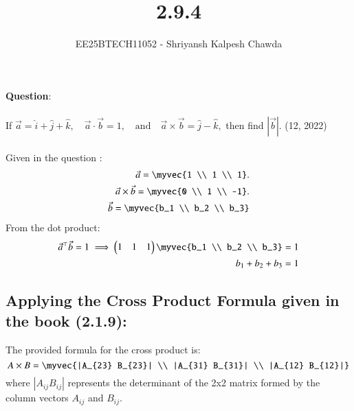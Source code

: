 \documentclass[journal]{IEEEtran}
\numberwithin{equation}{enumi}
\numberwithin{figure}{enumi}
\begin{document}
	
	
	\vspace{3cm}
	
	\title{2.9.4}
	\author{EE25BTECH11052 - Shriyansh Kalpesh Chawda}
\maketitle
	\textbf{Question}:\\
	\\
	If  $\vec{a} = \hat{i} + \hat{j} + \hat{k}, \quad \vec{a} \cdot \vec{b} = 1, \quad \text{and} \quad \vec{a} \times \vec{b} = \hat{j} - \hat{k},$ then find $|\vec{b}|$.
	\hfill (12, 2022)
	\\
	\solution\\
Given in the question :
\begin{align}
\vec{a} = \myvec{1 \\ 1 \\ 1}.\\
\vec{a} \times \vec{b} = \myvec{0 \\ 1 \\ -1}.\\
\vec{b} = \myvec{b_1 \\ b_2 \\ b_3}
\end{align}
From the dot product: \\
\begin{align}
\vec{a}^\top \vec{b} = 1 \implies
\begin{pmatrix} 1 & 1 & 1 \end{pmatrix} \myvec{b_1 \\ b_2 \\ b_3} = 1\\
b_1 + b_2 + b_3 = 1 
\end{align}
\subsection*{Applying the Cross Product Formula given in the book (2.1.9):}
The provided formula for the cross product is:
\[
A \times B = \myvec{|A_{23} B_{23}| \\ |A_{31} B_{31}| \\ |A_{12} B_{12}|}
\]
where $|A_{ij} B_{ij}|$ represents the determinant of the 2x2 matrix formed by the column vectors $A_{ij}$ and $B_{ij}$.
\end{document}
